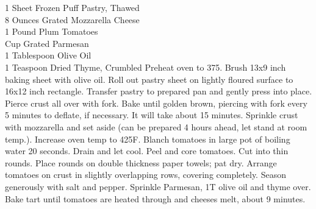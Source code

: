 {1 Sheet Frozen Puff Pastry, Thawed \\
 8 Ounces Grated Mozzarella Cheese \\
 1 Pound Plum Tomatoes \\
  Cup Grated Parmesan \\
 1 Tablespoon Olive Oil \\
 1 Teaspoon Dried Thyme, Crumbled}
{Preheat oven to 375\degree. Brush 13x9 inch baking sheet with olive oil. Roll out pastry sheet on lightly floured surface to 16x12 inch rectangle. Transfer pastry to prepared pan and gently press into place. Pierce crust all over with fork. Bake until golden brown, piercing with fork every 5 minutes to deflate, if necessary. It will take about 15 minutes. Sprinkle crust with mozzarella and set aside (can be prepared 4 hours ahead, let stand at room temp.). Increase oven temp to 425F. Blanch tomatoes in large pot of boiling water 20 seconds. Drain and let cool. Peel and core tomatoes. Cut into thin rounds. Place rounds on double thickness paper towels; pat dry. Arrange tomatoes on crust in slightly overlapping rows, covering completely. Season generously with salt and pepper. Sprinkle Parmesan, 1T olive oil and thyme over. Bake tart until tomatoes are heated through and cheeses melt, about 9 minutes.}


